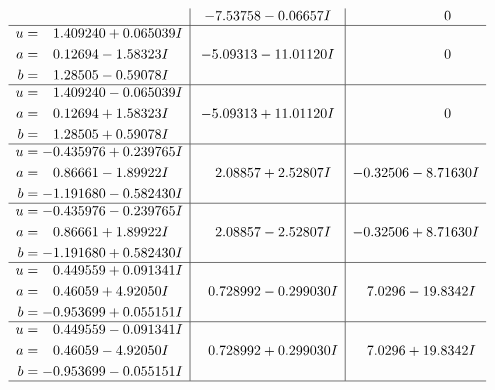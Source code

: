 \documentclass[1p]{elsarticle_modified}
\theoremstyle{definition}
\begin{document}
$$\begin{array}{c|c|c}
 & -7.53758 - 0.06657 I & \phantom{-0.000000 } 0 \\ \hline\begin{aligned}
u &= \phantom{-}1.409240 + 0.065039 I \\
a &= \phantom{-}0.12694 - 1.58323 I \\
b &= \phantom{-}1.28505 - 0.59078 I\end{aligned}
 & -5.09313 - 11.01120 I & \phantom{-0.000000 } 0 \\ \hline\begin{aligned}
u &= \phantom{-}1.409240 - 0.065039 I \\
a &= \phantom{-}0.12694 + 1.58323 I \\
b &= \phantom{-}1.28505 + 0.59078 I\end{aligned}
 & -5.09313 + 11.01120 I & \phantom{-0.000000 } 0 \\ \hline\begin{aligned}
u &= -0.435976 + 0.239765 I \\
a &= \phantom{-}0.86661 - 1.89922 I \\
b &= -1.191680 - 0.582430 I\end{aligned}
 & \phantom{-}2.08857 + 2.52807 I & -0.32506 - 8.71630 I \\ \hline\begin{aligned}
u &= -0.435976 - 0.239765 I \\
a &= \phantom{-}0.86661 + 1.89922 I \\
b &= -1.191680 + 0.582430 I\end{aligned}
 & \phantom{-}2.08857 - 2.52807 I & -0.32506 + 8.71630 I \\ \hline\begin{aligned}
u &= \phantom{-}0.449559 + 0.091341 I \\
a &= \phantom{-}0.46059 + 4.92050 I \\
b &= -0.953699 + 0.055151 I\end{aligned}
 & \phantom{-}0.728992 - 0.299030 I & \phantom{-}7.0296 - 19.8342 I \\ \hline\begin{aligned}
u &= \phantom{-}0.449559 - 0.091341 I \\
a &= \phantom{-}0.46059 - 4.92050 I \\
b &= -0.953699 - 0.055151 I\end{aligned}
 & \phantom{-}0.728992 + 0.299030 I & \phantom{-}7.0296 + 19.8342 I\\
 \hline 
 \end{array}$$\newpage$$\begin{array}{c|c|c}  

\end{array}$$
\end{document}
